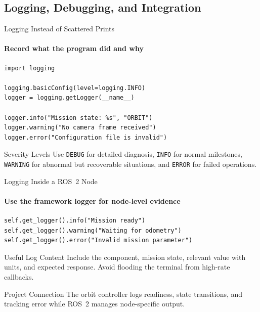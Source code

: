 \subsection{Logging, Debugging, and Integration}

\begin{frame}[fragile]{Logging Instead of Scattered Prints}
\framesubtitle{Record what the program did and why}
\begin{verbatim}
import logging

logging.basicConfig(level=logging.INFO)
logger = logging.getLogger(__name__)

logger.info("Mission state: %s", "ORBIT")
logger.warning("No camera frame received")
logger.error("Configuration file is invalid")
\end{verbatim}
\begin{block}{Severity Levels}
Use \texttt{DEBUG} for detailed diagnosis, \texttt{INFO} for normal milestones, \texttt{WARNING} for abnormal but recoverable situations, and \texttt{ERROR} for failed operations.
\end{block}
\end{frame}

\begin{frame}[fragile]{Logging Inside a ROS~2 Node}
\framesubtitle{Use the framework logger for node-level evidence}
\begin{verbatim}
self.get_logger().info("Mission ready")
self.get_logger().warning("Waiting for odometry")
self.get_logger().error("Invalid mission parameter")
\end{verbatim}
\begin{exampleblock}{Useful Log Content}
Include the component, mission state, relevant value with units, and expected response. Avoid flooding the terminal from high-rate callbacks.
\end{exampleblock}
\begin{block}{Project Connection}
The orbit controller logs readiness, state transitions, and tracking error while ROS~2 manages node-specific output.
\end{block}
\end{frame}

